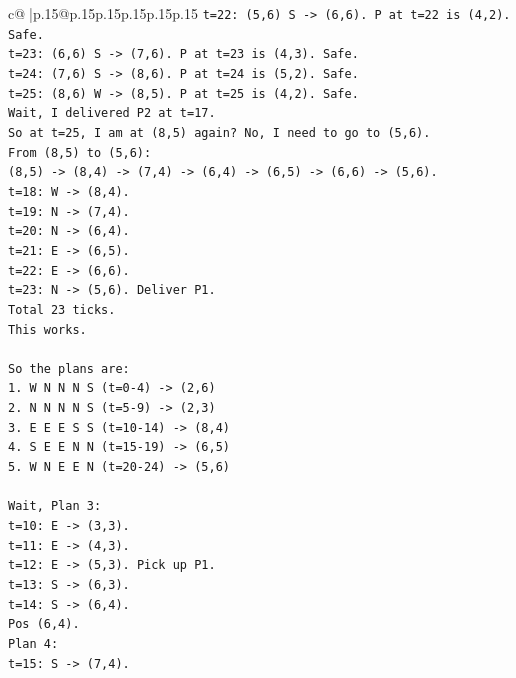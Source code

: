 \documentclass{article}
\begin{document}
{\begin{supertabular}{c@{$\;$}|p{.15\linewidth}@{}p{.15\linewidth}p{.15\linewidth}p{.15\linewidth}p{.15\linewidth}p{.15\linewidth}}
{{{\texttt{t=22: (5,6) S {-}> (6,6). P at t=22 is (4,2). Safe.} \\
\texttt{t=23: (6,6) S {-}> (7,6). P at t=23 is (4,3). Safe.} \\
\texttt{t=24: (7,6) S {-}> (8,6). P at t=24 is (5,2). Safe.} \\
\texttt{t=25: (8,6) W {-}> (8,5). P at t=25 is (4,2). Safe.} \\
\texttt{Wait, I delivered P2 at t=17.} \\
\texttt{So at t=25, I am at (8,5) again? No, I need to go to (5,6).} \\
\texttt{From (8,5) to (5,6):} \\
\texttt{(8,5) {-}> (8,4) {-}> (7,4) {-}> (6,4) {-}> (6,5) {-}> (6,6) {-}> (5,6).} \\
\texttt{t=18: W {-}> (8,4).} \\
\texttt{t=19: N {-}> (7,4).} \\
\texttt{t=20: N {-}> (6,4).} \\
\texttt{t=21: E {-}> (6,5).} \\
\texttt{t=22: E {-}> (6,6).} \\
\texttt{t=23: N {-}> (5,6). Deliver P1.} \\
\texttt{Total 23 ticks.} \\
\texttt{This works.} \\
\\ 
\texttt{So the plans are:} \\
\texttt{1. W N N N S (t=0{-}4) {-}> (2,6)} \\
\texttt{2. N N N N S (t=5{-}9) {-}> (2,3)} \\
\texttt{3. E E E S S (t=10{-}14) {-}> (8,4)} \\
\texttt{4. S E E N N (t=15{-}19) {-}> (6,5)} \\
\texttt{5. W N E E N (t=20{-}24) {-}> (5,6)} \\
\\ 
\texttt{Wait, Plan 3:} \\
\texttt{t=10: E {-}> (3,3).} \\
\texttt{t=11: E {-}> (4,3).} \\
\texttt{t=12: E {-}> (5,3). Pick up P1.} \\
\texttt{t=13: S {-}> (6,3).} \\
\texttt{t=14: S {-}> (6,4).} \\
\texttt{Pos (6,4).} \\
\texttt{Plan 4:} \\
\texttt{t=15: S {-}> (7,4).} \\
}}}
\end{supertabular}}
\end{document}
